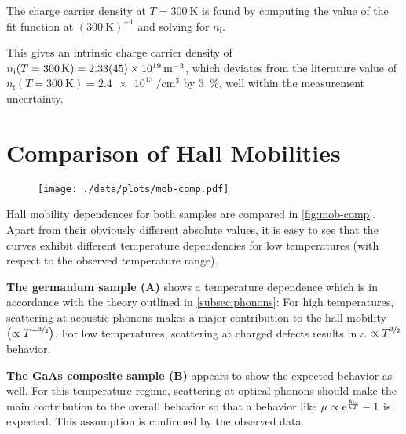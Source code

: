 The charge carrier density at $T = \SI{300}{\kelvin}$ is found by computing the value of the fit function at $\left(\SI{300}{\kelvin}\right)^{-1}$ and solving for $n_\text{i}$.

This gives an intrinsic charge carrier density of $n_\text{i} (T=\SI{300}{\kelvin}) = \SI{2.33 (45) e19}{\per\meter\cubed}$, which deviates from the literature value of $n_\text{i} (T=\SI{300}{\kelvin}) = \SI{2.4e13}{\per\centi\meter\cubed}$ by \SI{3}{\percent}, well within the measurement uncertainty.

\section{Comparison of Hall Mobilities}
\begin{figure}
  \centering
  \texttt{[image: ./data/plots/mob-comp.pdf]}
  \label{fig:mob-comp}
\end{figure}

Hall mobility dependences for both samples are compared in \autoref{fig:mob-comp}.
Apart from their obviously different absolute values, it is easy to see that the curves exhibit different temperature dependencies for low temperatures (with respect to the observed temperature range).

\textbf{The germanium sample (A)} shows a temperature dependence which is in accordance with the theory outlined in \autoref{subsec:phonons}: For high temperatures, scattering at acoustic phonons makes a major contribution to the hall mobility $\left(\propto T^{-\nicefrac{3}{2}}\right)$.
For low temperatures, scattering at charged defects results in a $\propto T^{\nicefrac{3}{2}}$ behavior.

\textbf{The GaAs composite sample (B)} appears to show the expected behavior as well.
For this temperature regime, scattering at optical phonons should make the main contribution to the overall behavior so that a behavior like $\mu\propto \mathrm{e}^\frac{\hbar \omega}{k T} - 1$ is expected.
This assumption is confirmed by the observed data.
